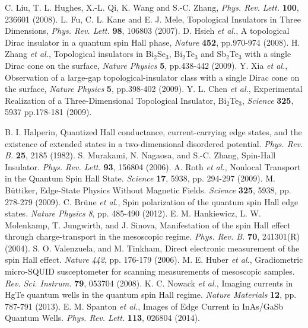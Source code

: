 \documentclass[titlepage,a4paper]{book}
\begin{document}
\begin{thebibliography}{99}
C. Liu, T. L. Hughes, X.-L. Qi, K. Wang and S.-C. Zhang, \textit{Phys. Rev. Lett.} \textbf{100}, 236601 (2008).
L. Fu, C. L. Kane and E. J. Mele, Topological Insulators in Three Dimensions, \textit{Phys. Rev. Lett.} \textbf{98}, 106803 (2007).
D. Hsieh \textit{et al.}, A topological Dirac insulator in a quantum spin Hall phase, \textit{Nature} \textbf{452}, pp.970-974 (2008).
H. Zhang \textit{et al.}, Topological insulators in Bi$_2$Se$_3$, Bi$_2$Te$_3$ and Sb$_2$Te$_3$ with a single Dirac cone on the surface, \textit{Nature Physics} \textbf{5}, pp.438-442 (2009).
Y. Xia \textit{et al.}, Observation of a large-gap topological-insulator class with a single Dirac cone on the surface, \textit{Nature Physics} \textbf{5}, pp.398-402 (2009).
Y. L. Chen \textit{et al.}, Experimental Realization of a Three-Dimensional Topological Insulator, Bi$_2$Te$_3$,  \textit{Science} \textbf{325}, 5937 pp.178-181 (2009).


B. I. Halperin, Quantized Hall conductance, current-carrying edge states, and the existence of extended states in a two-dimensional disordered potential. \textit{Phys. Rev. B.} \textbf{25}, 2185 (1982).
S. Murakami, N. Nagaosa, and S.-C. Zhang, Spin-Hall Insulator. \textit{Phys. Rev. Lett.} \textbf{93}, 156804 (2006).
A. Roth  \textit{et al.}, Nonlocal Transport in the Quantum Spin Hall State. \textit{Science} \textbf{17}, 5938, pp. 294-297 (2009).
M. Büttiker, Edge-State Physics Without Magnetic Fields. \textit{Science} \textbf{325}, 5938, pp. 278-279 (2009).
C. Brüne \textit{et al.}, Spin polarization of the quantum spin Hall edge states. \textit{Nature Physics} \textit{8}, pp. 485-490 (2012).
E. M. Hankiewicz, L. W. Molenkamp, T. Jungwirth, and J. Sinova, Manifestation of the spin Hall effect through charge-transport in the mesoscopic regime. \textit{Phys. Rev. B.} \textbf{70}, 241301(R) (2004).  
S. O. Valenzuela, and M. Tinkham, Direct electronic measurement of the spin Hall effect. \textit{Nature} \textit{442}, pp. 176-179 (2006).
M. E. Huber \textit{et al.}, Gradiometric micro-SQUID susceptometer for scanning measurements of mesoscopic samples. \textit{Rev. Sci. Instrum.} \textbf{79}, 053704 (2008).
K. C. Nowack \textit{et al.}, Imaging currents in HgTe quantum wells in the quantum spin Hall regime. \textit{Nature Materials} \textbf{12}, pp. 787-791 (2013).
E. M. Spanton \textit{et al.}, Images of Edge Current in InAs/GaSb Quantum Wells. \textit{Phys. Rev. Lett.} \textbf{113}, 026804 (2014).



\end{thebibliography}
\end{document}
